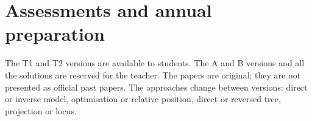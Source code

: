 \chapter{Assessments and annual preparation}\label{EVAL}
The T1 and T2 versions are available to students. The A and B versions and all the solutions are reserved for the teacher. The papers are original; they are not presented as official past papers. The approaches change between versions: direct or inverse model, optimisation or relative position, direct or reversed tree, projection or locus.

\ifprof\fi

\ifprof\fi
\ifprof

\ifprof\fi
\fi
\ifprof

\ifprof\fi
\fi

\ifprof\fi

\ifprof\fi
\ifprof

\ifprof\fi
\fi
\ifprof

\ifprof\fi
\fi

\ifprof\fi

\ifprof\fi
\ifprof

\ifprof\fi
\fi
\ifprof

\ifprof\fi
\fi

\ifprof\fi

\ifprof\fi
\ifprof

\ifprof\fi
\fi
\ifprof

\ifprof\fi
\fi
